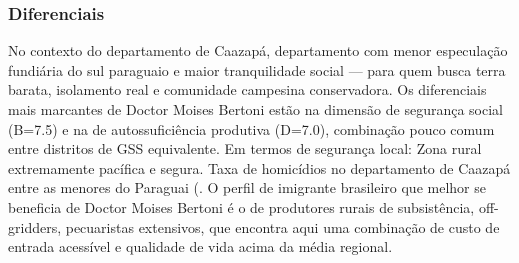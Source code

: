 \subsubsection*{Diferenciais}\label{dif-doctor-moises-bertoni-0604}
No contexto do departamento de Caazapá, departamento com menor especulação fundiária do sul paraguaio e maior tranquilidade social — para quem busca terra barata, isolamento real e comunidade campesina conservadora. Os diferenciais mais marcantes de Doctor Moises Bertoni estão na dimensão de segurança social (B=7.5) e na de autossuficiência produtiva (D=7.0), combinação pouco comum entre distritos de GSS equivalente. Em termos de segurança local: Zona rural extremamente pacífica e segura. Taxa de homicídios no departamento de Caazapá entre as menores do Paraguai (. O perfil de imigrante brasileiro que melhor se beneficia de Doctor Moises Bertoni é o de produtores rurais de subsistência, off-gridders, pecuaristas extensivos, que encontra aqui uma combinação de custo de entrada acessível e qualidade de vida acima da média regional.
